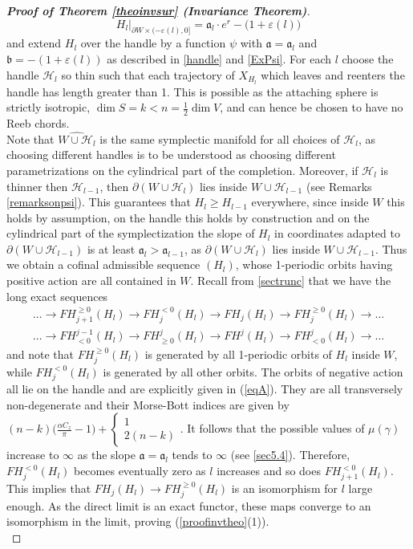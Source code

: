 \documentclass[a4paper,12pt,bibliography=totocnumbered,titlepage=false,abstracton,bookmarksnumbered=true]{scrartcl}
\newcommand{\veps}{\varepsilon}
\theoremstyle{definition}
\begin{document}
\begin{proof}[\textnormal{\textbf{Proof of Theorem \ref{theoinvsur} (Invariance Theorem)}}]
\[H_l|_{\partial W\times(-\veps(l),0]} = \mathfrak{a}_l{\cdot} e^r-\big(1{+}\veps(l)\big)\]
and extend $H_l$ over the handle by a function $\psi$ with $\mathfrak{a}=\mathfrak{a}_l$ and $\mathfrak{b}=-(1{+}\veps(l))$ as described in \ref{handle} and \ref{ExPsi}. For each $l$ choose the handle $\mathcal{H}_l$ so thin such that each trajectory of $X_{H_l}$ which leaves and reenters the handle has length greater than 1. This is possible as the attaching sphere is strictly isotropic, $\dim S=k<n=\frac{1}{2}\dim V$, and can hence be chosen to have no Reeb chords.\\
Note that $\widehat{W{\cup}\mathcal{H}_l}$ is the same symplectic manifold for all choices of $\mathcal{H}_l$, as choosing different handles is to be understood as choosing different parametrizations on the cylindrical part of the completion. Moreover, if $\mathcal{H}_l$ is thinner then $\mathcal{H}_{l-1}$, then $\partial(W{\cup}\mathcal{H}_l)$ lies inside $W{\cup}\mathcal{H}_{l-1}$ (see Remarks \ref{remarksonpsi}). This guarantees that $H_l\geq H_{l-1}$ everywhere, since inside $W$ this holds by assumption, on the handle this holds by construction and on the cylindrical part of the symplectization the slope of $H_l$ in coordinates adapted to $\partial(W{\cup}\mathcal{H}_{l-1})$ is at least $\mathfrak{a}_l>\mathfrak{a}_{l-1}$, as $\partial(W{\cup}\mathcal{H}_l)$ lies inside $W{\cup}\mathcal{H}_{l-1}$. Thus we obtain a cofinal admissible sequence $(H_l)$, whose 1-periodic orbits having positive action are all contained in $W$. Recall from \ref{sectrunc} that we have the long exact sequences
\begin{align*}
 \dots\rightarrow FH^{\geq 0}_{j+1}(H_l)\rightarrow FH^{<0}_j(H_l)\rightarrow FH_j(H_l)\rightarrow FH_j^{\geq 0}(H_l)\rightarrow\dots\\
 \dots\rightarrow FH_{< 0}^{j-1}(H_l)\rightarrow FH_{\geq0}^j(H_l)\rightarrow FH^j(H_l)\rightarrow FH^j_{< 0}(H_l)\rightarrow\dots
\end{align*}
and note that $FH^{\geq0}_j(H_l)$ is generated by all 1-periodic orbits of $H_l$ inside $W$, while $FH^{< 0}_j(H_l)$ is generated by all other orbits. The orbits of negative action all lie on the handle and are explicitly given in (\ref{eqA}). They are all transversely non-degenerate and their Morse-Bott indices are given by $(n{-}k)\big(\frac{\alpha C_z}{\pi}{-}1\big)+\left\lbrace\begin{smallmatrix}1\\ 2(n-k)\end{smallmatrix}\right.$. It follows that the possible values of $\mu(\gamma)$ increase to $\infty$ as the slope $\mathfrak{a}=\mathfrak{a}_l$ tends to $\infty$ (see \ref{sec5.4}). Therefore, $FH^{<0}_j(H_l)$ becomes eventually zero as $l$ increases and so does $FH^{<0}_{j+1}(H_l)$. This implies that $FH_j(H_l)\rightarrow FH^{\geq 0}_j(H_l)$ is an isomorphism for $l$ large enough. As the direct limit is an exact functor, these maps converge to an isomorphism in the limit, proving (\ref{proofinvtheo}(1)).\\

\end{proof}
\end{document}
